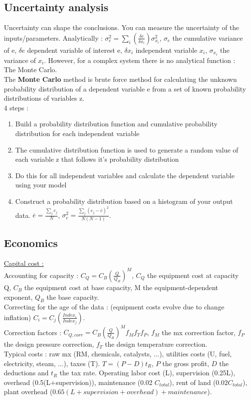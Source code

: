 \documentclass[../main.tex]{subfiles}
\begin{document}
\subsection{Uncertainty analysis}
Uncertainty can shape the conclusions. You can measure the uncertainty of the inputs/parameters. Analytically : $\sigma_e^2 = \sum_i (\frac{\delta e}{\delta x_i}) \sigma_{x_i}^2$, $\sigma_e$ the cumulative variance of e, $\delta e$ dependent variable of interest e, $\delta x_i$ independent variable $x_i$, $\sigma_{x_i}$ the variance of $x_i$. However, for a complex system there is no analytical function : The Monte Carlo.\\
The \textbf{Monte Carlo} method is brute force method for calculating the unknown probability distribution of a dependent variable e from a set of known probability distributions of variables z. \\
4 steps : \begin{enumerate}
    \item Build a probability distribution function and cumulative probability distribution for each independent variable
    \item The cumulative distribution function is used to generate a random value of each variable z that follows it's probability distribution
    \item Do this for all independent variables and calculate the dependent variable using your model
    \item Construct a probability distribution based on a histogram of your output data. $\overline{e} = \frac{\sum_j e_j}{N}$, $\sigma_e^2 = \frac{\sum_j (e_j-\overline{e})^2}{N(N-1)}$.\\
\end{enumerate}

\subsection{Economics}
\quad \underline{Capital cost :}\\
Accounting for capacity : $C_Q = C_B (\frac{Q}{Q_B})^M$, $C_Q$ the equipment cost at capacity Q, $C_B$ the equipment cost at base capacity, M the equipment-dependent exponent, $Q_B$ the base capacity. \\
Correcting for the age of the data : (equipment costs evolve due to change inflation) $C_i = C_j (\frac{Index_i}{Index_j})$.\\
Correction factors : $C_{Q,corr} = C_B (\frac{Q}{Q_B})^M f_M f_Tf_P$, $f_M$ the mx correction factor, $f_P$ the design pressure correction, $f_T$ the design temperature correction. \\
Typical costs : raw mx (RM, chemicals, catalysts, ...), utilities costs (U, fuel, electricity, steam, ...), taxes (T). $T = (P-D)t_R$, $P$ the gross profit, $D$ the deductions and $t_R$ the tax rate. Operating labor cost (L), supervision (0.25L), overhead (0.5(L+supervision)), maintenance (0.02 $C_{total}$), rent of land ($0.02C_{total}$), plant overhead ($0.65 (L+supervision+overhead)+maintenance$).\\
\end{document}
